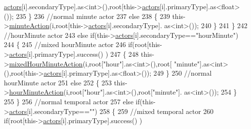 \begin{DoxyCode}
      \hyperlink{class_jetpack_a7e16d2f97837f9712a2e6de1c50d99db}{actors}[i].secondaryType].as<int>(),root[this->\hyperlink{class_jetpack_a7e16d2f97837f9712a2e6de1c50d99db}{actors}[i].primaryType].as<float>());
235                         \}
236                         \textcolor{comment}{//normal minute actor}
237                         \textcolor{keywordflow}{else}
238                         \{
239                             this->\hyperlink{class_jetpack_a97da41141c7b53ddee61143519c8d17d}{minuteAction}(i,root[this->\hyperlink{class_jetpack_a7e16d2f97837f9712a2e6de1c50d99db}{actors}[i].secondaryType].
      as<int>());
240                         \}
241                     \}
242                     \textcolor{comment}{//hourMinute actor}
243                     \textcolor{keywordflow}{else} \textcolor{keywordflow}{if}(this->\hyperlink{class_jetpack_a7e16d2f97837f9712a2e6de1c50d99db}{actors}[i].secondaryType==\textcolor{stringliteral}{"hourMinute"})
244                     \{
245                         \textcolor{comment}{//mixed hourMinute actor}
246                         \textcolor{keywordflow}{if}(root[this->\hyperlink{class_jetpack_a7e16d2f97837f9712a2e6de1c50d99db}{actors}[i].primaryType].success() )
247                         \{
248                             this->\hyperlink{class_jetpack_a273dae1517b56f0242e28b8944edc26b}{mixedHourMinuteAction}(i,root[\textcolor{stringliteral}{"hour"}].as<int>(),root[\textcolor{stringliteral}{
      "minute"}].as<int>(),root[this->\hyperlink{class_jetpack_a7e16d2f97837f9712a2e6de1c50d99db}{actors}[i].primaryType].as<float>());
249                         \}
250                         \textcolor{comment}{//normal hourMinute actor}
251                         \textcolor{keywordflow}{else}
252                         \{
253                             this->\hyperlink{class_jetpack_ae01c13c785ebdf1b0bb5500234aba1bd}{hourMinuteAction}(i,root[\textcolor{stringliteral}{"hour"}].as<int>(),root[\textcolor{stringliteral}{"minute"}].
      as<int>());
254                         \}
255                     \}
256                     \textcolor{comment}{//normal temporal actor}
257                     \textcolor{keywordflow}{else} \textcolor{keywordflow}{if}(this->\hyperlink{class_jetpack_a7e16d2f97837f9712a2e6de1c50d99db}{actors}[i].secondaryType==\textcolor{stringliteral}{""})
258                     \{
259                         \textcolor{comment}{//mixed temporal actor}
260                         \textcolor{keywordflow}{if}(root[this->\hyperlink{class_jetpack_a7e16d2f97837f9712a2e6de1c50d99db}{actors}[i].primaryType].success() )

\end{DoxyCode}
